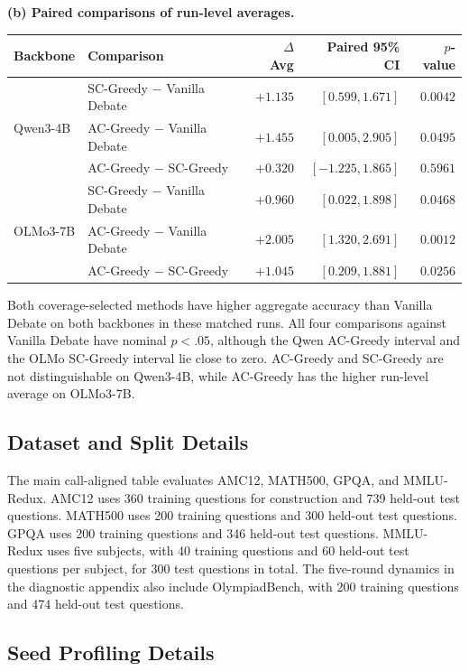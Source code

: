 \begin{table}[t]
\vspace{0.7em}
\textbf{(b) Paired comparisons of run-level averages.}\\[0.25em]
\scriptsize
\begin{tabular}{llrrr}
\toprule
Backbone & Comparison & $\Delta$ Avg & Paired 95\% CI & $p$-value \\
\midrule
\multirow{3}{*}{Qwen3-4B}
 & SC-Greedy $-$ Vanilla Debate & $+1.135$ & $[0.599, 1.671]$ & $0.0042$ \\
 & AC-Greedy $-$ Vanilla Debate & $+1.455$ & $[0.005, 2.905]$ & $0.0495$ \\
 & AC-Greedy $-$ SC-Greedy & $+0.320$ & $[-1.225, 1.865]$ & $0.5961$ \\
\midrule
\multirow{3}{*}{OLMo3-7B}
 & SC-Greedy $-$ Vanilla Debate & $+0.960$ & $[0.022, 1.898]$ & $0.0468$ \\
 & AC-Greedy $-$ Vanilla Debate & $+2.005$ & $[1.320, 2.691]$ & $0.0012$ \\
 & AC-Greedy $-$ SC-Greedy & $+1.045$ & $[0.209, 1.881]$ & $0.0256$ \\
\bottomrule
\end{tabular}
\end{table}

Both coverage-selected methods have higher aggregate accuracy than Vanilla
Debate on both backbones in these matched runs. All four comparisons against
Vanilla Debate have nominal $p<.05$, although the Qwen AC-Greedy interval and
the OLMo SC-Greedy interval lie close to zero. AC-Greedy and SC-Greedy are not
distinguishable on Qwen3-4B, while AC-Greedy has the higher run-level average
on OLMo3-7B.

\subsection{Dataset and Split Details}
\label{app:dataset_split_details}

The main call-aligned table evaluates AMC12, MATH500, GPQA, and MMLU-Redux.
AMC12 uses 360 training questions for construction and 739 held-out test
questions. MATH500 uses 200 training questions and 300 held-out test questions.
GPQA uses 200 training questions and 346 held-out test questions. MMLU-Redux
uses five subjects, with 40 training questions and 60 held-out test questions
per subject, for 300 test questions in total. The five-round dynamics in the
diagnostic appendix also include OlympiadBench, with 200 training questions and
474 held-out test questions.

\subsection{Seed Profiling Details}
\label{app:seed_profiling_details}

